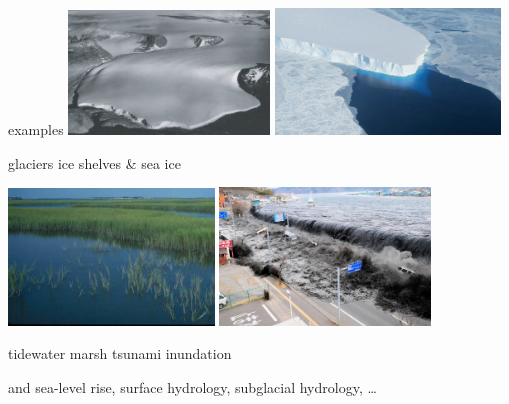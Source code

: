 \documentclass[hide notes,intlimits]{beamer}
\begin{document}
\begin{frame}{examples}
\includegraphics[width=0.4\textwidth,keepaspectratio=true]{polaris}
\hfill
\includegraphics[width=0.45\textwidth,keepaspectratio=true]{supp4rignot-small}

\small glaciers \hfill ice shelves \& sea ice
\medskip

\includegraphics[width=0.41\textwidth,keepaspectratio=true]{marsh-water}
\hfill
\includegraphics[width=0.42\textwidth,keepaspectratio=true]{tsunami-sendai}

\small tidewater marsh \hfill tsunami inundation

\scriptsize and sea-level rise, surface hydrology, subglacial hydrology, \dots
\end{frame}
\end{document}
